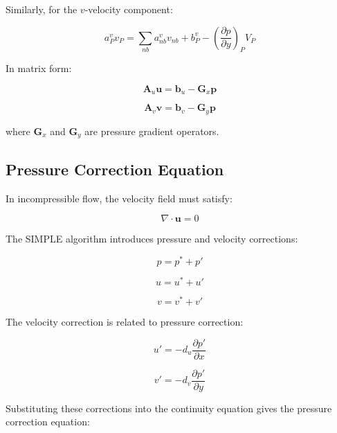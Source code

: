 \documentclass[12pt,a4paper]{article}
\begin{document}
Similarly, for the \(v\)-velocity component:

\begin{equation}
    a_P^v v_P = \sum_{nb} a_{nb}^v v_{nb} + b_P^v - \left(  \frac{\partial p}{\partial y}    \right)_P V_P
\end{equation}

In matrix form:

\begin{equation}
    \bm{A}_u\bm{u} = \bm{b}_u - \bm{G}_x\bm{p}
\end{equation}

\begin{equation}
    \bm{A}_v\bm{v} = \bm{b}_v - \bm{G}_y\bm{p}
\end{equation}

where \(\bm{G}_x\) and \(\bm{G}_y\) are pressure gradient operators.

\subsection{Pressure Correction Equation}

In incompressible flow, the velocity field must satisfy:

\begin{equation}
    \nabla \cdot \bm{u} = 0
\end{equation}

The SIMPLE algorithm introduces pressure and velocity corrections:

\begin{equation}
    p = p^* + p'
\end{equation}

\begin{equation}
    u = u^* + u'
\end{equation}

\begin{equation}
    v = v^* + v'
\end{equation}

The velocity correction is related to pressure correction:

\begin{equation}
    u' = -d_u \frac{\partial p'}{\partial x}
\end{equation}

\begin{equation}
    v' = -d_v \frac{\partial p'}{\partial y}
\end{equation}

Substituting these corrections into the continuity equation gives the pressure correction equation:
\end{document}
